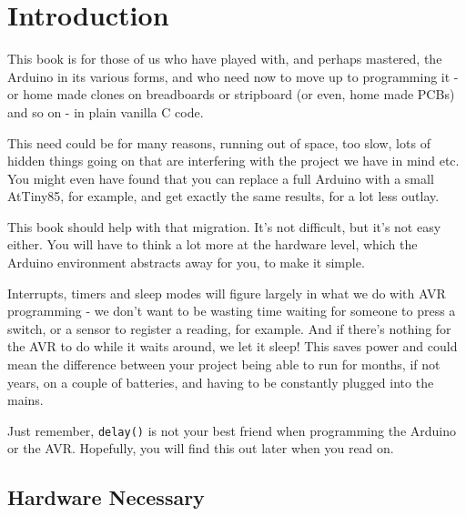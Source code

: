 \section*{Introduction}\label{introduction}

This book is for those of us who have played with, and perhaps mastered,
the Arduino in its various forms, and who need now to move up to
programming it - or home made clones on breadboards or stripboard (or
even, home made PCBs) and so on - in plain vanilla C code.

This need could be for many reasons, running out of space, too slow,
lots of hidden things going on that are interfering with the project we
have in mind etc. You might even have found that you can replace a full
Arduino with a small AtTiny85, for example, and get exactly the same
results, for a lot less outlay.

This book should help with that migration. It's not difficult, but it's
not easy either. You will have to think a lot more at the hardware
level, which the Arduino environment abstracts away for you, to make it
simple.

Interrupts, timers and sleep modes will figure largely in what we do
with AVR programming - we don't want to be wasting time waiting for
someone to press a switch, or a sensor to register a reading, for
example. And if there's nothing for the AVR to do while it waits around,
we let it sleep! This saves power and could mean the difference between
your project being able to run for months, if not years, on a couple of
batteries, and having to be constantly plugged into the mains.

Just remember, \texttt{delay()} is not your best friend when programming
the Arduino or the AVR. Hopefully, you will find this out later when you
read on.

\subsection*{Hardware Necessary}\label{hardware-necessary}

